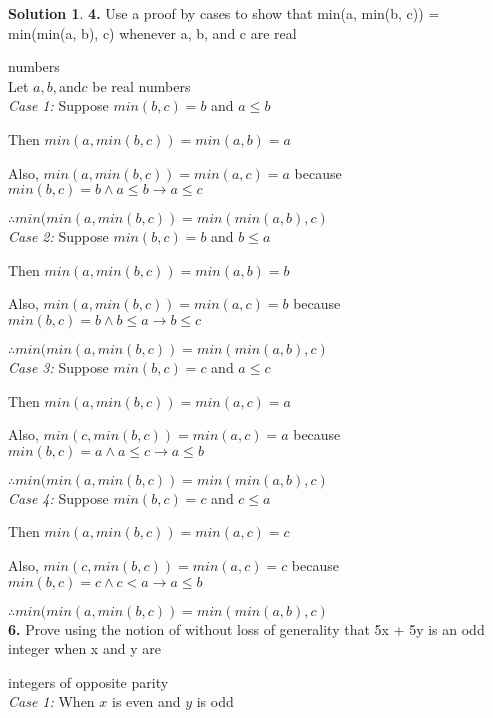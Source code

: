 \documentclass{article}
\theoremstyle{definition}
\newtheorem*{solution}{Solution}
\begin{document}
\begin{solution}
\textbf{4.} Use a proof by cases to show that min(a, min(b, c)) = min(min(a, b), c) whenever a, b, and c are real


numbers\\


Let $a,b,$and$ c$ be real numbers\\


\textit{Case 1:} Suppose $min(b,c) = b$ and $a \leq b$


Then $min(a,min(b,c))= min(a,b) = a$


Also, $min(a,min(b,c))= min(a,c) = a$ because $min(b,c) = b \wedge a \leq b \rightarrow a \leq c$


$\therefore min(min(a,min(b,c)) = min(min(a,b),c)$\\



\textit{Case 2:} Suppose $min(b,c) = b$ and $b \leq a$


Then $min(a,min(b,c))= min(a,b) = b$


Also, $min(a,min(b,c))= min(a,c) = b$ because $min(b,c) = b \wedge b \leq a \rightarrow b \leq c$


$\therefore min(min(a,min(b,c)) = min(min(a,b),c)$\\


\textit{Case 3:} Suppose $min(b,c) = c$ and $a \leq c$


Then $min(a,min(b,c))= min(a,c) = a$


Also, $min(c,min(b,c))= min(a,c) = a$ because $min(b,c) = a \wedge a \leq c \rightarrow a \leq b$


$\therefore min(min(a,min(b,c)) = min(min(a,b),c)$\\



\textit{Case 4:} Suppose $min(b,c) = c$ and $c \leq a$


Then $min(a,min(b,c))= min(a,c) = c$


Also, $min(c,min(b,c))= min(a,c) = c$ because $min(b,c) = c \wedge c < a \rightarrow a \leq b$


$\therefore min(min(a,min(b,c)) = min(min(a,b),c)$\\


\textbf{6.} Prove using the notion of without loss of generality that 5x + 5y is an odd integer when x and y are


integers of opposite parity\\


\textit{Case 1:} When $x$ is even and $y$ is odd



\end{solution}
\end{document}
